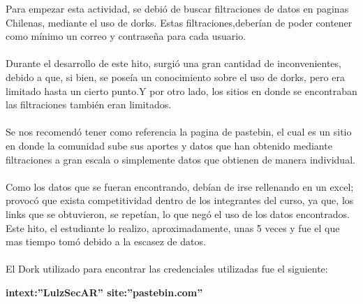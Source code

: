 \documentclass{article}
\begin{document}
    Para empezar esta actividad, se debió de buscar filtraciones de datos en paginas Chilenas, mediante el uso de dorks.
     Estas filtraciones,deberían de poder contener como mínimo un correo y contraseña para cada usuario.      
    \\\\
    Durante el desarrollo de este hito, surgió una gran cantidad de inconvenientes, debido a que, si bien, se poseía un conocimiento
    sobre el uso de dorks, pero era limitado hasta un cierto punto.Y por otro lado, los sitios en donde se encontraban las filtraciones
    también eran limitados.
    \\\\
    Se nos recomendó tener como referencia la pagina de pastebin, el cual es un sitio en donde la comunidad sube sus aportes y datos que han
    obtenido mediante filtraciones a gran escala o simplemente datos que obtienen de manera individual.
    \\\\
    Como los datos que se fueran encontrando, debían de irse rellenando en un excel; provocó que exista competitividad dentro de los 
    integrantes del curso, ya que, los links que se obtuvieron, se repetían, lo que negó el uso de los datos encontrados. Este hito,
    el estudiante lo realizo, aproximadamente, unas 5 veces y fue el que mas tiempo tomó debido a la escasez de datos. 
    \\\\
    El Dork utilizado para encontrar las credenciales utilizadas fue el siguiente:
    \\
    \begin{center}
        \textbf{intext:''LulzSecAR'' site:''pastebin.com''}
    \end{center}
\end{document}
